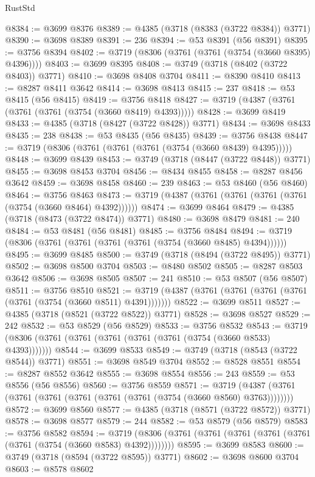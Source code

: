 \begin{lexlean}{RustStd}
\begin{coremodule}
@8384 := @3699 @8376
@8389 := @4385 (@3718 (@8383 (@3722 @8384)) @3771)
@8390 := @3698 @8389
@8391 := 236
@8394 := @53 @8391 (@56 @8391)
@8395 := @3756 @8394
@8402 := @3719 (@8306 (@3761 (@3761 (@3754 (@3660 @8395) @4396))))
@8403 := @3699 @8395
@8408 := @3749 (@3718 (@8402 (@3722 @8403)) @3771)
@8410 := @3698 @8408 @3704
@8411 := @8390 @8410
@8413 := @8287 @8411 @3642
@8414 := @3698 @8413
@8415 := 237
@8418 := @53 @8415 (@56 @8415)
@8419 := @3756 @8418
@8427 := @3719 (@4387 (@3761 (@3761 (@3761 (@3754 (@3660 @8419) @4393)))))
@8428 := @3699 @8419
@8433 := @4385 (@3718 (@8427 (@3722 @8428)) @3771)
@8434 := @3698 @8433
@8435 := 238
@8438 := @53 @8435 (@56 @8435)
@8439 := @3756 @8438
@8447 := @3719 (@8306 (@3761 (@3761 (@3761 (@3754 (@3660 @8439) @4395)))))
@8448 := @3699 @8439
@8453 := @3749 (@3718 (@8447 (@3722 @8448)) @3771)
@8455 := @3698 @8453 @3704
@8456 := @8434 @8455
@8458 := @8287 @8456 @3642
@8459 := @3698 @8458
@8460 := 239
@8463 := @53 @8460 (@56 @8460)
@8464 := @3756 @8463
@8473 := @3719 (@4387 (@3761 (@3761 (@3761 (@3761 (@3754 (@3660 @8464) @4392))))))
@8474 := @3699 @8464
@8479 := @4385 (@3718 (@8473 (@3722 @8474)) @3771)
@8480 := @3698 @8479
@8481 := 240
@8484 := @53 @8481 (@56 @8481)
@8485 := @3756 @8484
@8494 := @3719 (@8306 (@3761 (@3761 (@3761 (@3761 (@3754 (@3660 @8485) @4394))))))
@8495 := @3699 @8485
@8500 := @3749 (@3718 (@8494 (@3722 @8495)) @3771)
@8502 := @3698 @8500 @3704
@8503 := @8480 @8502
@8505 := @8287 @8503 @3642
@8506 := @3698 @8505
@8507 := 241
@8510 := @53 @8507 (@56 @8507)
@8511 := @3756 @8510
@8521 := @3719 (@4387 (@3761 (@3761 (@3761 (@3761 (@3761 (@3754 (@3660 @8511) @4391)))))))
@8522 := @3699 @8511
@8527 := @4385 (@3718 (@8521 (@3722 @8522)) @3771)
@8528 := @3698 @8527
@8529 := 242
@8532 := @53 @8529 (@56 @8529)
@8533 := @3756 @8532
@8543 := @3719 (@8306 (@3761 (@3761 (@3761 (@3761 (@3761 (@3754 (@3660 @8533) @4393)))))))
@8544 := @3699 @8533
@8549 := @3749 (@3718 (@8543 (@3722 @8544)) @3771)
@8551 := @3698 @8549 @3704
@8552 := @8528 @8551
@8554 := @8287 @8552 @3642
@8555 := @3698 @8554
@8556 := 243
@8559 := @53 @8556 (@56 @8556)
@8560 := @3756 @8559
@8571 := @3719 (@4387 (@3761 (@3761 (@3761 (@3761 (@3761 (@3761 (@3754 (@3660 @8560) @3763))))))))
@8572 := @3699 @8560
@8577 := @4385 (@3718 (@8571 (@3722 @8572)) @3771)
@8578 := @3698 @8577
@8579 := 244
@8582 := @53 @8579 (@56 @8579)
@8583 := @3756 @8582
@8594 := @3719 (@8306 (@3761 (@3761 (@3761 (@3761 (@3761 (@3761 (@3754 (@3660 @8583) @4392))))))))
@8595 := @3699 @8583
@8600 := @3749 (@3718 (@8594 (@3722 @8595)) @3771)
@8602 := @3698 @8600 @3704
@8603 := @8578 @8602

\end{coremodule}
\end{lexlean}
